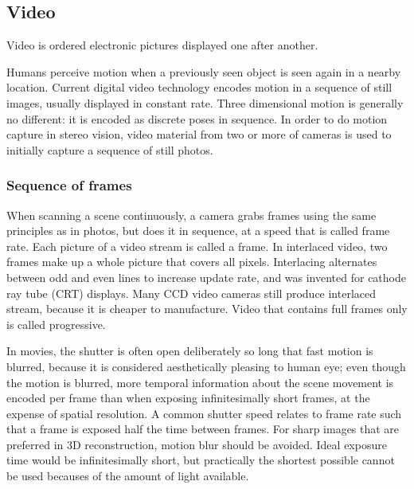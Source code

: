 

\subsection{Video} \label{sec:video} %

Video is ordered electronic pictures displayed one after another.



Humans perceive motion when a previously seen object is seen again in a nearby location.
Current digital video technology encodes motion in a sequence of still images, usually displayed in constant rate.
Three dimensional motion is generally no different: it is encoded as discrete poses in sequence.
In order to do motion capture in stereo vision, video material from two or more of cameras is used to initially capture a sequence of still photos.


\subsubsection{Sequence of frames} %

When scanning a scene continuously, a camera grabs frames using the same principles as in photos, but does it in sequence, at a speed that is called frame rate.
Each picture of a video stream is called a frame.
In interlaced video, two frames make up a whole picture that covers all pixels.
Interlacing alternates between odd and even lines to increase update rate, and was invented for cathode ray tube (CRT) displays.
Many CCD video cameras still produce interlaced stream, because it is cheaper to manufacture.
Video that contains full frames only is called progressive.

In movies, the shutter is often open deliberately so long that fast motion is blurred, because it is considered aesthetically pleasing to human eye; even though the motion is blurred, more temporal information about the scene movement is encoded per frame than when exposing infinitesimally short frames, at the expense of spatial resolution.
A common shutter speed relates to frame rate such that a frame is exposed half the time between frames.
\cite{wilson2004anton}
For sharp images that are preferred in 3D reconstruction, motion blur should be avoided.
Ideal exposure time would be infinitesimally short, but practically the shortest possible cannot be used becauses of the amount of light available.

